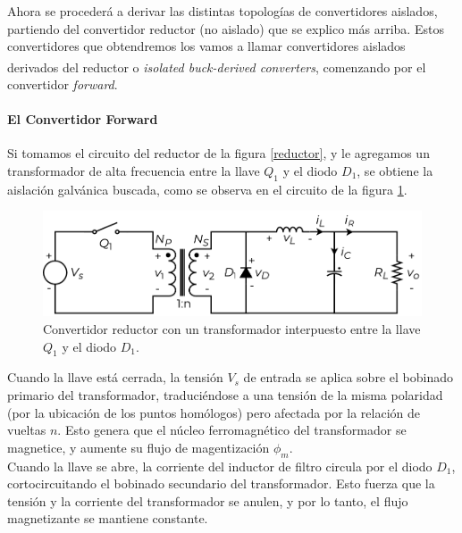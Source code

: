 Ahora se procederá a derivar las distintas topologías de convertidores aislados, partiendo del convertidor reductor (no aislado) que se explico más arriba. Estos convertidores que obtendremos los vamos a llamar {\Medium convertidores aislados derivados del reductor} o \textit{isolated buck-derived converters}\textsuperscript{\cite{SoftSwitchPWM}}, comenzando por el convertidor \textit{forward}.\\

\paragraph{El Convertidor Forward}

Si tomamos el circuito del reductor de la figura \ref{reductor}, y le agregamos un transformador de alta frecuencia entre la llave $Q_1$ y el diodo $D_1$, se obtiene la aislación galvánica buscada, como se observa en el circuito de la figura \ref{desarrollo_forward}.\\

\begin{figure}[h]
    \centering
    \includegraphics[scale=0.6]{Imagenes/Desarrollo Forward 1.pdf}
    \caption{Convertidor reductor con un transformador interpuesto entre la llave $Q_1$ y el diodo $D_1$.}
    \label{desarrollo_forward}
\end{figure}

Cuando la llave está cerrada, la tensión $V_s$ de entrada se aplica sobre el bobinado primario del transformador, traduciéndose a una tensión de la misma polaridad (por la ubicación de los puntos homólogos) pero afectada por la relación de vueltas $n$. Esto genera que el núcleo ferromagnético del transformador se magnetice, y aumente su flujo de magentización $\phi_m$.\\

Cuando la llave se abre, la corriente del inductor de filtro circula por el diodo $D_1$, cortocircuitando el bobinado secundario del transformador. Esto fuerza que la tensión y la corriente del transformador se anulen, y por lo tanto, el flujo magnetizante se mantiene constante.\\

